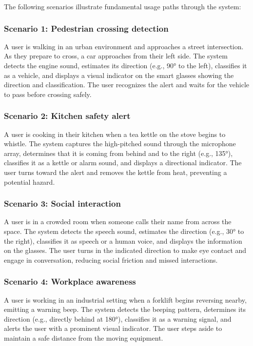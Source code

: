 \documentclass[12pt]{article}
\theoremstyle{definition}
\begin{document}
The following scenarios illustrate fundamental usage paths through the system:

\subsubsection{Scenario 1: Pedestrian crossing detection}
A user is walking in an urban environment and approaches a street
intersection. As they prepare to cross, a car approaches from their left
side. The system detects the engine sound, estimates its direction (e.g.,
90° to the left), classifies it as a vehicle, and displays a visual
indicator on the smart glasses showing the direction and classification.
The user recognizes the alert and waits for the vehicle to pass before
crossing safely.

\subsubsection{Scenario 2: Kitchen safety alert}
A user is cooking in their kitchen when a tea kettle on the stove begins
to whistle. The system captures the high-pitched sound through the
microphone array, determines that it is coming from behind and to the
right (e.g., 135°), classifies it as a kettle or alarm sound, and displays
a directional indicator. The user turns toward the alert and removes the
kettle from heat, preventing a potential hazard.

\subsubsection{Scenario 3: Social interaction}
A user is in a crowded room when someone calls their name from across the
space. The system detects the speech sound, estimates the direction (e.g.,
30° to the right), classifies it as speech or a human voice, and displays
the information on the glasses. The user turns in the indicated direction
to make eye contact and engage in conversation, reducing social friction
and missed interactions.

\subsubsection{Scenario 4: Workplace awareness}
A user is working in an industrial setting when a forklift begins reversing
nearby, emitting a warning beep. The system detects the beeping pattern,
determines its direction (e.g., directly behind at 180°), classifies it as
a warning signal, and alerts the user with a prominent visual indicator.
The user steps aside to maintain a safe distance from the moving equipment.
\end{document}
